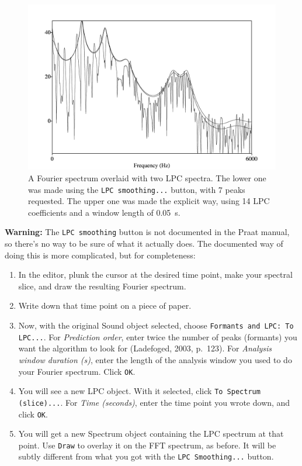\documentclass[12pt, letterpaper]{article}
\begin{document}
\begin{figure}[h!]
\centering
\includegraphics[width=0.75\linewidth]{figs/formants.jpg}
\caption{A Fourier spectrum overlaid with two LPC spectra. The lower one was made using the \texttt{LPC smoothing...} button, with 7 peaks requested. The upper one was made the explicit way, using 14 LPC coefficients and a window length of 0.05~s.}
\end{figure}

\noindent\textbf{Warning:} The \texttt{LPC smoothing} button is not documented in the Praat manual, so there’s no way to be sure of what it actually does. The documented way of doing this is more complicated, but for completeness:

\begin{enumerate}[label=(\alph*)]
    \item In the editor, plunk the cursor at the desired time point, make your spectral slice, and draw the resulting Fourier spectrum.
    \item Write down that time point on a piece of paper.
    \item Now, with the original Sound object selected, choose \texttt{Formants and LPC: To LPC...}. For \textit{Prediction order}, enter twice the number of peaks (formants) you want the algorithm to look for (Ladefoged, 2003, p.~123). For \textit{Analysis window duration (s)}, enter the length of the analysis window you used to do your Fourier spectrum. Click \texttt{OK}.
    \item You will see a new LPC object. With it selected, click \texttt{To Spectrum (slice)...}. For \textit{Time (seconds)}, enter the time point you wrote down, and click \texttt{OK}.
    \item You will get a new Spectrum object containing the LPC spectrum at that point. Use \texttt{Draw} to overlay it on the FFT spectrum, as before. It will be subtly different from what you got with the \texttt{LPC Smoothing...} button.
\end{enumerate}
\end{document}
